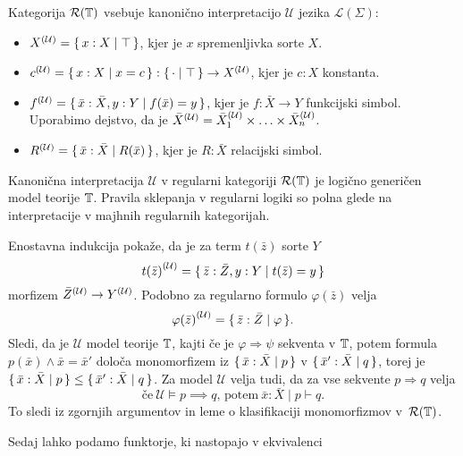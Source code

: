 \documentclass[../kategoricna_logika.tex]{subfiles}
\begin{document}
\begin{definicija}
  Kategorija $\mathcal{R}(\T)$ vsebuje kanonično interpretacijo
  $\mathcal{U}$ jezika $\mathcal{L}(\Sigma)$:
  \begin{itemize}
  \item $\interp[\mathcal{U}]{X} = \set{x:X \mid  \top}$, kjer je
    $x$ spremenljivka sorte $X$.
  \item
    $\interp[\mathcal{U}]{c} = \set{x:X \mid  x = c} :
    \set{\cdot \mid  \top} \to \interp[\mathcal{U}]{X}$, kjer je
    $c:X$ konstanta.
  \item
    $\interp[\mathcal{U}]{f} = \set{\bar{x}:\bar{X},y:Y \mid  f(\bar{x})
      = y}$, kjer je $f : \bar{X}\to Y$ funkcijski simbol. Uporabimo
    dejstvo, da je
    $\bar{X}^{(\mathcal{U})} = \interp[\mathcal{U}]{\bar{X}_1} \times
    \ldots \times \interp[\mathcal{U}]{\bar{X}_n}$.
  \item
    $\interp[\mathcal{U}]{R} = \set{\bar{x}:\bar{X} \mid  R(\bar{x})}$,
    kjer je $R : \bar{X}$ relacijski simbol.
  \end{itemize}
\end{definicija}
\begin{izrek}\label{izrek:logicno-genericen-model-regularne-logike}
  Kanonična interpretacija $\mathcal{U}$ v regularni kategoriji
  $\mathcal{R}(\T)$ je logično generičen model teorije $\T$. Pravila
  sklepanja v regularni logiki so polna glede na interpretacije v
  majhnih regularnih kategorijah.
\end{izrek}
\begin{dokaz}
  Enostavna indukcija pokaže, da je za term $t(\bar{z})$ sorte $Y$
$$\caninterp{t(\bar{z})} = \set{\bar{z}:\bar{Z},y:Y \mid  t(\bar{z}) = y}$$
morfizem $\caninterp{\bar{Z}} \to \caninterp{Y}$.
Podobno za regularno
formulo $\varphi(\bar{z})$ velja
$$\caninterp{\varphi(\bar{z})} = \set{\bar{z}:\bar{Z} \mid  \varphi}.$$
Sledi, da je $\mathcal{U}$ model teorije $\T$, kajti če je
$\varphi \Rightarrow \psi$ sekventa v $\T$, potem formula
$p(\bar{x}) \wedge \bar{x}= \bar{x}'$ določa monomorfizem iz
$\set{\bar{x}:\bar{X} \mid  p}$ v $\set{\bar{x}':\bar{X} \mid  q}$, torej
je $\set{\bar{x}:\bar{X} \mid  p} \leq \set{\bar{x}':{\bar{X}} \mid  q}$.
Za model $\mathcal{U}$ velja tudi, da za vse sekvente
$p \Rightarrow q$ velja
$$\text{če} \ \mathcal{U} \models p \implies q \text{, potem} \ \bar{x}:\bar{X} \mid p \vdash q.$$
To sledi iz zgornjih argumentov in leme o klasifikaciji monomorfizmov
v~$\mathcal{R}(\T)$.
\end{dokaz}
Sedaj lahko podamo funktorje, ki nastopajo v ekvivalenci
\end{document}
